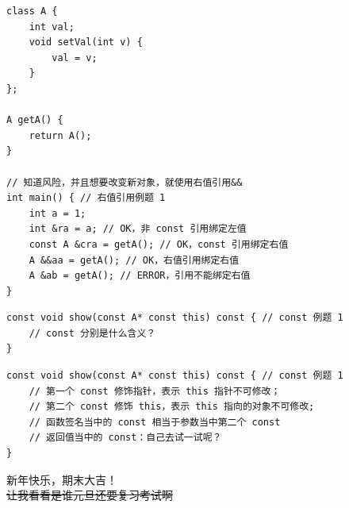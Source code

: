 \documentclass[10pt,aspectratio=169,mathserif]{beamer}
\begin{document}
\begin{frame}[fragile]
	\begin{lstlisting}
class A {
    int val;
    void setVal(int v) {
        val = v;
    }
};

A getA() {
    return A();
}

// 知道风险，并且想要改变新对象，就使用右值引用&&
int main() { // 右值引用例题 1
    int a = 1;
    int &ra = a; // OK，非 const 引用绑定左值
    const A &cra = getA(); // OK，const 引用绑定右值
    A &&aa = getA(); // OK，右值引用绑定右值
    A &ab = getA(); // ERROR，引用不能绑定右值
}
    \end{lstlisting}
\end{frame}

\begin{frame}[fragile]
	\begin{lstlisting}
const void show(const A* const this) const { // const 例题 1
    // const 分别是什么含义？
}
    \end{lstlisting}
\end{frame}

\begin{frame}[fragile]
	\begin{lstlisting}
const void show(const A* const this) const { // const 例题 1
    // 第一个 const 修饰指针，表示 this 指针不可修改；
    // 第二个 const 修饰 this，表示 this 指向的对象不可修改;
    // 函数签名当中的 const 相当于参数当中第二个 const
    // 返回值当中的 const：自己去试一试呢？
}
    \end{lstlisting}
\end{frame}

\begin{frame}[fragile]
	\vfill
	\centering
	\Large 新年快乐，期末大吉！\\
	\sout{让我看看是谁元旦还要复习考试啊}
	\vfill
\end{frame}
\end{document}
